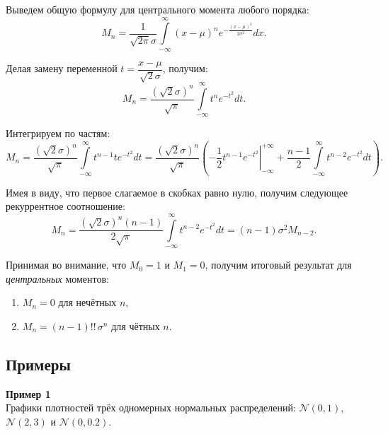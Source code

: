 \documentclass[11pt,a4paper]{article}
\providecommand{\tightlist}{%
      \setlength{\itemsep}{0pt}\setlength{\parskip}{0pt}}
\begin{document}
Выведем общую формулу для центрального момента любого порядка: \[
  M_n = \dfrac{1}{\sqrt{2\pi}\sigma} \int\limits_{-\infty}^{\infty}(x-\mu)^n e^{-\frac{(x-\mu)^2}{2\sigma^2}}dx.
\]

Делая замену переменной \(t = \dfrac{x-\mu}{\sqrt{2}\sigma}\), получим:
\[
  M_n = \dfrac{(\sqrt{2}\sigma)^n}{\sqrt{\pi}} \int\limits_{-\infty}^{\infty}t^n e^{-t^2}dt.
\]

Интегрируем по частям: \[
  M_n = \dfrac{(\sqrt{2}\sigma)^n}{\sqrt{\pi}} \int\limits_{-\infty}^{\infty}t^{n-1}t e^{-t^2}dt
  = \dfrac{(\sqrt{2}\sigma)^n}{\sqrt{\pi}} \left( \left.-\dfrac{1}{2}t^{n-1}e^{-t^2} \right|_{-\infty}^{+\infty}
  + \dfrac{n-1}{2} \int\limits_{-\infty}^{\infty}t^{n-2} e^{-t^2}dt \right).
\]

Имея в виду, что первое слагаемое в скобках равно нулю, получим
следующее рекуррентное соотношение: \[
  M_n = \dfrac{(\sqrt{2}\sigma)^n (n-1)}{2\sqrt{\pi}} \int\limits_{-\infty}^{\infty}t^{n-2} e^{-t^2}dt
  = (n-1) \sigma^2 M_{n-2}.
\]

    Принимая во внимание, что \(M_0=1\) и \(M_1=0\), получим итоговый
результат для \emph{центральных} моментов:

\begin{enumerate}
\def\labelenumi{\arabic{enumi}.}
\tightlist
\item
  \(M_n = 0\) для нечётных \(n\),
\item
  \(M_n = (n-1)!!\,\sigma^n\) для чётных \(n\).
\end{enumerate}

    \hypertarget{ux43fux440ux438ux43cux435ux440ux44b}{%
\subsection{Примеры}\label{ux43fux440ux438ux43cux435ux440ux44b}}

\textbf{Пример 1}\\
Графики плотностей трёх одномерных нормальных распределений:
\(\mathcal{N}(0, 1)\), \(\mathcal{N}(2, 3)\) и \(\mathcal{N}(0, 0.2)\).
\end{document}
